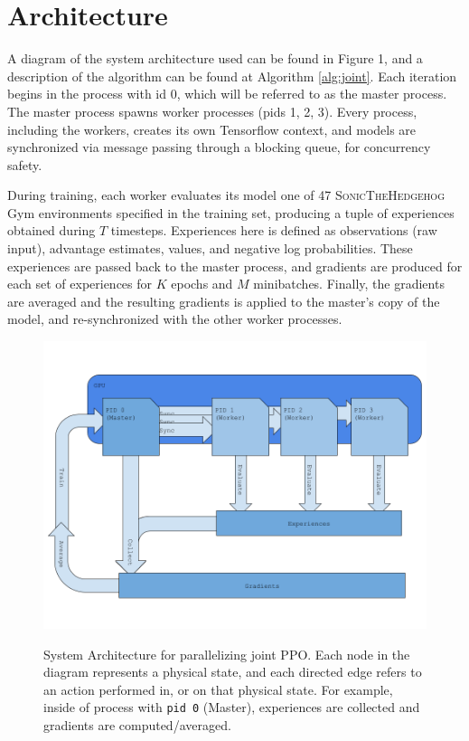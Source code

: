 \documentclass{article}
\begin{document}
\section{Architecture}

A diagram of the system architecture used can be found in Figure 1, and a description of the algorithm can be found at Algorithm \ref{alg:joint}. Each iteration begins in the process with id 0, which will be referred to as the master process. The master process spawns worker processes (pids 1, 2, 3). Every process, including the workers, creates its own Tensorflow context, and models are synchronized via message passing through a blocking queue, for concurrency safety. 

During training, each worker evaluates its model one of 47 \textsc{SonicTheHedgehog} Gym environments specified in the training set, producing a tuple of experiences obtained during $T$ timesteps. Experiences here is defined as observations (raw input), advantage estimates, values, and negative log probabilities. These experiences are passed back to the master process, and gradients are produced for each set of experiences for $K$ epochs and $M$ minibatches. Finally, the gradients are averaged and the resulting gradients is applied to the master's copy of the model, and re-synchronized with the other worker processes.

\begin{figure}[htbp]
  \centering
  \includegraphics[width=\columnwidth]{arch.png}
  \label{fig:arch}
  \caption{System Architecture for parallelizing joint PPO. Each node in the diagram represents a physical state, and each directed edge refers to an action performed in, or on that physical state. For example, inside of process with \texttt{pid 0} (Master), experiences are collected and gradients are computed/averaged. }
\end{figure}
\end{document}

